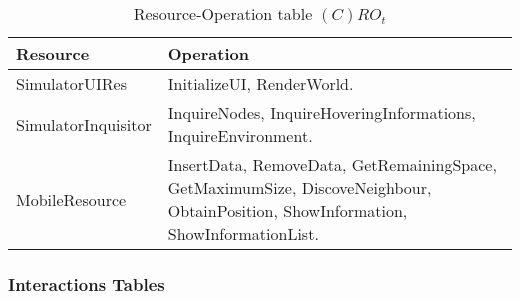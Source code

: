 \begin{table}[H]
	\centering
	\begin{tabular}{|p{4cm}|p{8cm}|}
			\hline
			\textbf{Resource} & \textbf{Operation} \\
			\hline
			SimulatorUIRes & InitializeUI, RenderWorld. \\
			\hline
			SimulatorInquisitor & InquireNodes, InquireHoveringInformations, InquireEnvironment. \\
			\hline
			MobileResource & InsertData, RemoveData, GetRemainingSpace,
			GetMaximumSize, DiscoveNeighbour, ObtainPosition, ShowInformation,
			ShowInformationList. \\
			\hline
		\end{tabular}
	\caption{Resource-Operation table $(C)RO_t$}
	\label{tab:crot}
\end{table}

\subsubsection{Interactions Tables}

